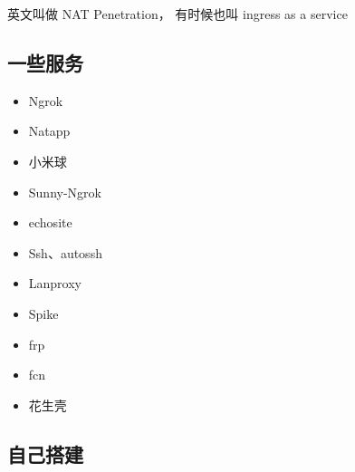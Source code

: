 
\begin{issues}
\issueDraft
\end{issues}

英文叫做 NAT Penetration， 有时候也叫 ingress as a service

\subsection{一些服务}
\begin{itemize}
\item Ngrok
\item Natapp
\item 小米球
\item Sunny-Ngrok
\item echosite
\item Ssh、autossh
\item Lanproxy
\item Spike
\item frp
\item fcn
\item 花生壳
\end{itemize}

\subsection{自己搭建}
